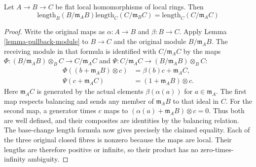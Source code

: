 \begin{lemma}
\label{lemma-pullback-transitive}
Let $A \to B \to C$ be flat local homomorphisms of local rings. Then
$$
\text{length}_B(B/\mathfrak m_A B)
\text{length}_C(C/\mathfrak m_B C)
=
\text{length}_C(C/\mathfrak m_A C)
$$
\end{lemma}

\begin{proof}
Write the original maps as $\alpha:A\to B$ and $\beta:B\to C$.
Apply Lemma \ref{lemma-pullback-module} to $B\to C$ and the
original module $B/\mathfrak m_AB$. The receiving module in
that formula is identified with $C/\mathfrak m_AC$ by the maps
$\Phi:(B/\mathfrak m_AB)\otimes_B C\to C/\mathfrak m_AC$
and $\Psi:C/\mathfrak m_AC\to(B/\mathfrak m_AB)\otimes_B C$:
$$
\begin{aligned}
\Phi((b+\mathfrak m_AB)\otimes c)&=\beta(b)c+\mathfrak m_AC,\\
\Psi(c+\mathfrak m_AC)&=(1+\mathfrak m_AB)\otimes c.
\end{aligned}
$$
Here $\mathfrak m_AC$ is generated by the actual elements
$\beta(\alpha(a))$ for $a\in\mathfrak m_A$.
The first map respects balancing and sends any member of
$\mathfrak m_AB$ to that ideal in $C$.
For the second map, a generator times $c$ maps to
$(\alpha(a)+\mathfrak m_AB)\otimes c=0$.
Thus both are well defined, and their composites are identities
by the balancing relation. The base-change length formula now
gives precisely the claimed equality. Each of the three original
closed fibres is nonzero because the maps are local. Their
lengths are therefore positive or infinite, so their product
has no zero-times-infinity ambiguity.
\end{proof}











